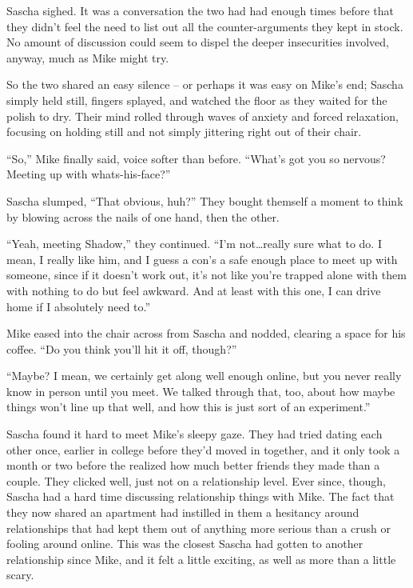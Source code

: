 Sascha sighed. It was a conversation the two had had enough times before that they didn't feel the need to list out all the counter-arguments they kept in stock. No amount of discussion could seem to dispel the deeper insecurities involved, anyway, much as Mike might try.

So the two shared an easy silence -- or perhaps it was easy on Mike's end; Sascha simply held still, fingers splayed, and watched the floor as they waited for the polish to dry. Their mind rolled through waves of anxiety and forced relaxation, focusing on holding still and not simply jittering right out of their chair.

``So,'' Mike finally said, voice softer than before. ``What's got you so nervous? Meeting up with whats-his-face?''

Sascha slumped, ``That obvious, huh?'' They bought themself a moment to think by blowing across the nails of one hand, then the other.

``Yeah, meeting Shadow,'' they continued. ``I'm not\ldots{}really sure what to do. I mean, I really like him, and I guess a con's a safe enough place to meet up with someone, since if it doesn't work out, it's not like you're trapped alone with them with nothing to do but feel awkward. And at least with this one, I can drive home if I absolutely need to.''

Mike eased into the chair across from Sascha and nodded, clearing a space for his coffee. ``Do you think you'll hit it off, though?''

``Maybe? I mean, we certainly get along well enough online, but you never really know in person until you meet. We talked through that, too, about how maybe things won't line up that well, and how this is just sort of an experiment.''

Sascha found it hard to meet Mike's sleepy gaze. They had tried dating each other once, earlier in college before they'd moved in together, and it only took a month or two before the realized how much better friends they made than a couple. They clicked well, just not on a relationship level. Ever since, though, Sascha had a hard time discussing relationship things with Mike. The fact that they now shared an apartment had instilled in them a hesitancy around relationships that had kept them out of anything more serious than a crush or fooling around online. This was the closest Sascha had gotten to another relationship since Mike, and it felt a little exciting, as well as more than a little scary.

